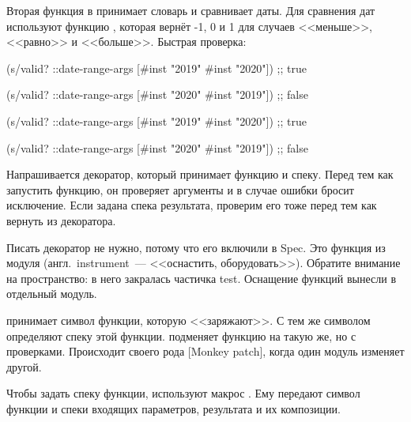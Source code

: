 \fi


Вторая функция в  принимает словарь и сравнивает даты. Для сравнения
дат используют функцию , которая вернёт \mbox{-1}, 0 и 1 для
случаев <<меньше>>, <<равно>> и <<больше>>. Быстрая проверка:

\ifnarrow

\begin{clojure}
(s/valid? ::date-range-args
          [#inst "2019" #inst "2020"])
;; true

(s/valid? ::date-range-args
          [#inst "2020" #inst "2019"])
;; false
\end{clojure}

\else

\begin{clojure}
(s/valid? ::date-range-args
          [#inst "2019" #inst "2020"]) ;; true

(s/valid? ::date-range-args
          [#inst "2020" #inst "2019"]) ;; false
\end{clojure}

\fi


Напрашивается декоратор, который принимает функцию и спеку. Перед тем как
запустить функцию, он проверяет аргументы и в случае ошибки бросит исключение.
Если задана спека результата, проверим его тоже перед тем как вернуть из
декоратора.


Писать декоратор не нужно, потому что его включили в Spec. Это функция
 из модуля 
(англ.~instru\-ment~--- <<оснастить, оборудовать>>). Обратите внимание на
пространство: в него закралась частичка test. Оснащение функций вынесли в
отдельный модуль.


 принимает символ функции, которую <<заряжают>>. С тем же
символом определяют спеку этой функции.  подменяет функцию на
такую же, но с проверками. Происходит своего рода [Monkey patch], когда
один модуль изменяет другой.

Чтобы задать спеку функции, используют макрос . Ему передают символ
функции и спеки входящих параметров, результата и их композиции.

